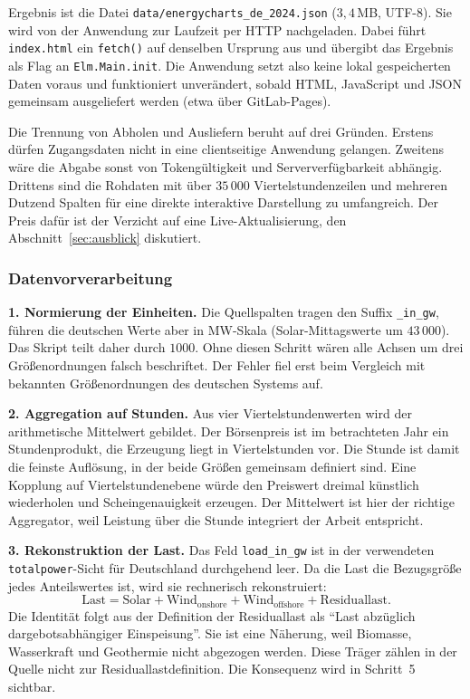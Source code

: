 Ergebnis ist die Datei \texttt{data/energycharts\_de\_2024.json} ($3{,}4$\,MB, UTF-8). Sie wird von
der Anwendung zur Laufzeit per HTTP nachgeladen. Dabei führt \texttt{index.html} ein \texttt{fetch()} auf
denselben Ursprung aus und übergibt das Ergebnis als Flag an \texttt{Elm.Main.init}. Die Anwendung
setzt also keine lokal gespeicherten Daten voraus und funktioniert unverändert, sobald HTML,
JavaScript und JSON gemeinsam ausgeliefert werden (etwa über GitLab-Pages).

Die Trennung von Abholen und Ausliefern beruht auf drei Gründen. Erstens dürfen Zugangsdaten nicht in eine
clientseitige Anwendung gelangen. Zweitens wäre die Abgabe sonst von Tokengültigkeit und
Serververfügbarkeit abhängig. Drittens sind die Rohdaten mit über $35\,000$ Viertelstundenzeilen und
mehreren Dutzend Spalten für eine direkte interaktive Darstellung zu umfangreich. Der Preis dafür ist der
Verzicht auf eine Live-Aktualisierung, den Abschnitt~\ref{sec:ausblick} diskutiert.

\subsubsection*{Datenvorverarbeitung}

\textbf{1. Normierung der Einheiten.} Die Quellspalten tragen den Suffix \texttt{\_in\_gw}, führen die
deutschen Werte aber in MW-Skala (Solar-Mittagswerte um $43\,000$). Das Skript teilt daher durch
$1000$. Ohne diesen Schritt wären alle Achsen um drei Größenordnungen falsch beschriftet. Der
Fehler fiel erst beim Vergleich mit bekannten Größenordnungen des deutschen Systems auf.

\textbf{2. Aggregation auf Stunden.} Aus vier Viertelstundenwerten wird der arithmetische Mittelwert
gebildet. Der Börsenpreis ist im betrachteten Jahr ein Stundenprodukt, die Erzeugung liegt in
Viertelstunden vor. Die Stunde ist damit die feinste Auflösung, in der beide Größen gemeinsam
definiert sind. Eine Kopplung auf Viertelstundenebene würde den Preiswert dreimal künstlich
wiederholen und Scheingenauigkeit erzeugen. Der Mittelwert ist hier der richtige Aggregator, weil
Leistung über die Stunde integriert der Arbeit entspricht.

\textbf{3. Rekonstruktion der Last.} Das Feld \texttt{load\_in\_gw} ist in der verwendeten
\texttt{totalpower}-Sicht für Deutschland durchgehend leer. Da die Last die Bezugsgröße jedes
Anteilswertes ist, wird sie rechnerisch rekonstruiert:
\[
  \mathrm{Last} = \mathrm{Solar} + \mathrm{Wind}_{\text{onshore}} + \mathrm{Wind}_{\text{offshore}}
                      + \mathrm{Residuallast}.
\]
Die Identität folgt aus der Definition der Residuallast als \enquote{Last abzüglich
dargebotsabhängiger Einspeisung}. Sie ist eine Näherung, weil Biomasse, Wasserkraft und Geothermie
nicht abgezogen werden. Diese Träger zählen in der Quelle nicht zur Residuallastdefinition. Die
Konsequenz wird in Schritt~5 sichtbar.

